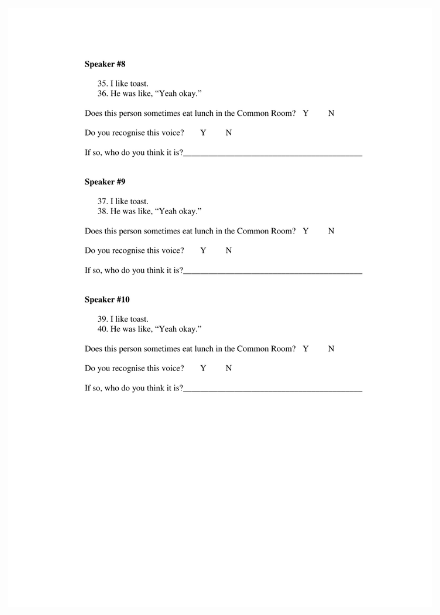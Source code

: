 \begin{figure}
	\centering
		\includegraphics[width=5in]{images/Exp3page7.pdf}
		\label{x3p7}
\end{figure}



